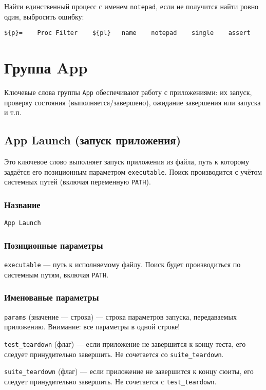 \documentclass[11pt]{book} %
\begin{document}
Найти единственный процесс с именем \verb"notepad", если не получится найти ровно один, выбросить ошибку:
\begin{verbatim}${p}=    Proc Filter    ${pl}   name    notepad    single    assert\end{verbatim}



\section{Группа App}
Ключевые слова группы \verb"App" обеспечивают работу с приложениями: их запуск, проверку состояния (выполняется/завершено), ожидание завершения или запуска и т.п.


\subsection{App Launch (запуск приложения)}
Это ключевое слово выполняет запуск приложения из файла, путь к которому задаётся его позиционным параметром \verb"executable". Поиск производится с учётом системных путей (включая переменную \verb"PATH").


\subsubsection*{Название} 
\verb"App Launch"

\subsubsection*{Позиционные параметры} 

\verb"executable" --- путь к исполняемому файлу. Поиск будет производиться по системным путям, включая \verb"PATH".

\subsubsection*{Именованые параметры} 
\verb"params" (значение --- строка) --- строка параметров запуска, передаваемых приложению. Внимание: все параметры в одной строке!

\verb"test_teardown" (флаг) --- если приложение не завершится к концу теста, его следует принудительно завершить. Не сочетается со \verb"suite_teardown".

\verb"suite_teardown" (флаг) --- если приложение не завершится к концу сюиты, его следует принудительно завершить. Не сочетается с \verb"test_teardown".
\end{document}
